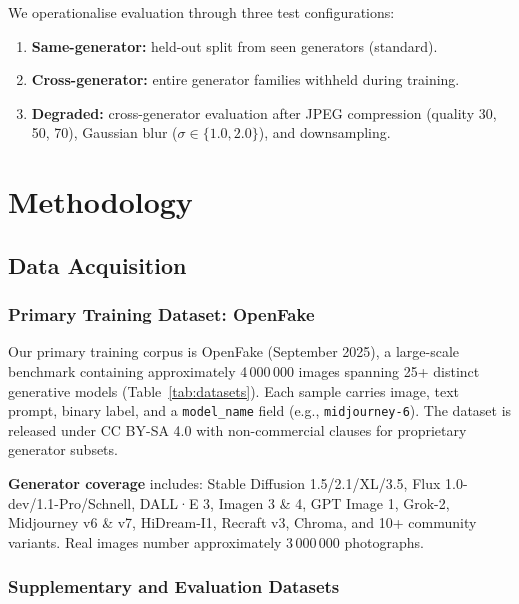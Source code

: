\documentclass[12pt, a4paper]{article}
\begin{document}
We operationalise evaluation through three test configurations:
\begin{enumerate}[leftmargin=*, label=(\arabic*)]
  \item \textbf{Same-generator:} held-out split from seen generators (standard).
  \item \textbf{Cross-generator:} entire generator families withheld during training.
  \item \textbf{Degraded:} cross-generator evaluation after JPEG compression
        (quality 30, 50, 70), Gaussian blur ($\sigma \in \{1.0, 2.0\}$), and
        downsampling.
\end{enumerate}

\section{Methodology}
\label{sec:method}

\subsection{Data Acquisition}
\label{sec:data}

\subsubsection{Primary Training Dataset: OpenFake}

Our primary training corpus is OpenFake (September 2025), a large-scale benchmark
containing approximately 4\,000\,000 images spanning 25+ distinct generative
models (Table~\ref{tab:datasets}).  Each sample carries image, text prompt, binary
label, and a \texttt{model\_name} field (e.g., \texttt{midjourney-6}).  The dataset
is released under CC BY-SA 4.0 with non-commercial clauses for proprietary
generator subsets.

\textbf{Generator coverage} includes: Stable Diffusion 1.5/2.1/XL/3.5,
Flux 1.0-dev/1.1-Pro/Schnell, DALL·E 3, Imagen 3 \& 4, GPT Image 1, Grok-2,
Midjourney v6 \& v7, HiDream-I1, Recraft v3, Chroma, and 10+ community variants.
Real images number approximately 3\,000\,000 photographs.

\subsubsection{Supplementary and Evaluation Datasets}
\end{document}
